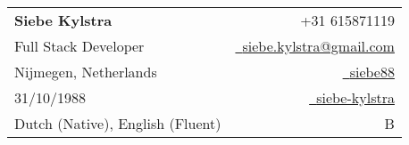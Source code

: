 
\begin{tabularx}{\linewidth}{L r} \\
  \textbf{\Large Siebe Kylstra} & {\raisebox{0.0\height}{\footnotesize \faPhone}\ +31 615871119}\\
  {Full Stack Developer} & \href{mailto:siebe.kylstra@gmail.com}{\raisebox{0.0\height}{\footnotesize \faEnvelope}\ {siebe.kylstra@gmail.com}} \\
  {Nijmegen, Netherlands} & \href{https://github.com/siebe88}{\raisebox{0.0\height}{\footnotesize \faGithub}\ {siebe88}} \\
  {31/10/1988} & \href{https://linkedin.com/in/siebe-kylstra}{\raisebox{0.0\height}{\footnotesize \faLinkedin}\ {siebe-kylstra}} \\
  {Dutch (Native), English (Fluent)} & {\raisebox{0.0\height}{\footnotesize \faCar}\ B}
\end{tabularx}
\vspace{\headerEndSpacing}
